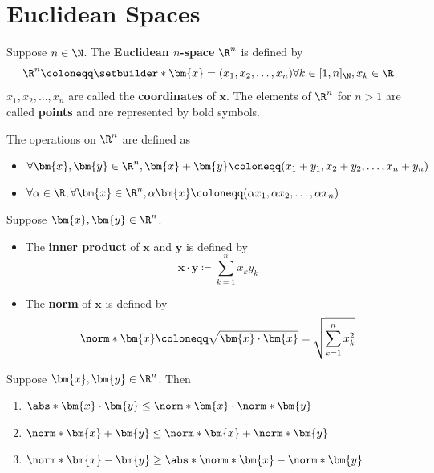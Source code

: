 \section{Euclidean Spaces}

\begin{definition} \label{an:def:euclidean-space}
  Suppose $n \in \N$. The \textbf{Euclidean $n$-space} $\R^{n}$ is defined by
  \[
    \R^{n} \coloneqq \setbuilder*{\bm{x} = (x_{1}, x_{2}, \dots, x_{n})}{\forall k \in [1, n]_{\N}, x_{k} \in \R}
  \]
  $x_{1}, x_{2}, \dots, x_{n}$ are called the \textbf{coordinates} of $\bm{x}$.
  The elements of $\R^{n}$ for $n > 1$ are called \textbf{points} and are represented by bold symbols.
\end{definition}

\bigskip

\begin{definition} \label{an:def:operations-on-Rn}
  The operations on $\R^{n}$ are defined as
  \begin{itemize}
    \item $\forall \bm{x}, \bm{y} \in \R^{n},
            \bm{x} + \bm{y} \coloneqq (x_{1} + y_{1}, x_{2} + y_{2}, \dots, x_{n} + y_{n})$
    \item $\forall \alpha \in \R, \forall \bm{x} \in \R^{n},
            \alpha \bm{x} \coloneqq (\alpha x_{1}, \alpha x_{2}, \dots, \alpha x_{n})$
  \end{itemize}
\end{definition}

\bigskip

\begin{definition} \label{an:def:inner-product-norm}
  Suppose $\bm{x}, \bm{y} \in \R^{n}$.
  \begin{itemize}
    \item The \textbf{inner product} of $\bm{x}$ and $\bm{y}$ is defined by
          \[
            \bm{x} \cdot \bm{y} \coloneqq \sum_{k = 1}^{n} x_{k}y_{k}
          \]
    \item The \textbf{norm} of $\bm{x}$ is defined by
          \[
            \norm*{\bm{x}} \coloneqq \sqrt{\bm{x} \cdot \bm{x}} = \sqrt{\sum_{k = 1}^{n} x_{k}^{2}}
          \]
  \end{itemize}
\end{definition}

\bigskip

\begin{theorem} \label{an:thm:properties-of-inner-product-norme}
  Suppose $\bm{x}, \bm{y} \in \R^{n}$. Then
  \begin{enumerate}[label=\textbf{(\Alph*)}]
    \item $\abs*{\bm{x} \cdot \bm{y}} \leq \norm*{\bm{x}} \cdot \norm*{\bm{y}}$
    \item $\norm*{\bm{x} + \bm{y}} \leq \norm*{\bm{x}} + \norm*{\bm{y}}$
    \item $\norm*{\bm{x} - \bm{y}} \geq \abs*{\norm*{\bm{x}} - \norm*{\bm{y}}}$
  \end{enumerate}
\end{theorem}

